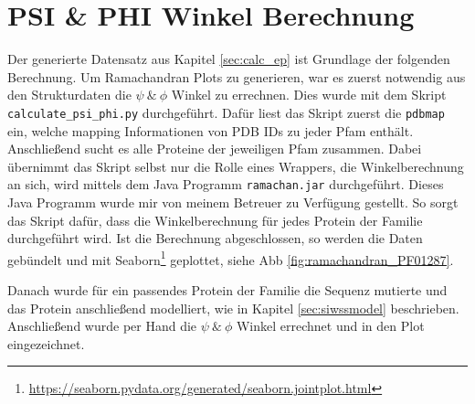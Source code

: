 \newpage
\section{PSI \& PHI Winkel Berechnung}
Der generierte Datensatz aus Kapitel \ref{sec:calc_ep} ist Grundlage der folgenden Berechnung. Um Ramachandran Plots zu generieren, war es zuerst notwendig aus den Strukturdaten die $\psi\ \&\ \phi$ Winkel zu errechnen. Dies wurde mit dem Skript \texttt{calculate\_psi\_phi.py} durchgeführt. Dafür liest das Skript zuerst die \texttt{pdbmap} ein, welche mapping Informationen von PDB IDs zu jeder Pfam enthält. Anschließend sucht es alle Proteine der jeweiligen Pfam zusammen. Dabei übernimmt das Skript selbst nur die Rolle eines Wrappers, die Winkelberechnung an sich, wird mittels dem Java Programm \texttt{ramachan.jar} durchgeführt. Dieses Java Programm wurde mir von meinem Betreuer zu Verfügung gestellt. So sorgt das Skript dafür, dass die Winkelberechnung für jedes Protein der Familie durchgeführt wird. Ist die Berechnung abgeschlossen, so werden die Daten gebündelt und mit Seaborn\footnote{\url{https://seaborn.pydata.org/generated/seaborn.jointplot.html}} geplottet, siehe \ac{Abb} \ref{fig:ramachandran_PF01287}. 

Danach wurde für ein passendes Protein der Familie die Sequenz mutierte und das Protein anschließend modelliert, wie in Kapitel \ref{sec:siwssmodel} beschrieben. Anschließend wurde per Hand die $\psi\ \&\ \phi$ Winkel errechnet und in den Plot eingezeichnet.





